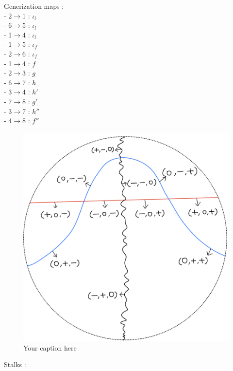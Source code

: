 Generization maps : \\

- 2$\rightarrow$1 : $\iota_l$\\
- 6$\rightarrow$5 : $\iota_l$\\
- 1$\rightarrow$4 : $\iota_l$\\
- 1$\rightarrow$5 : $\iota_f$\\
- 2$\rightarrow$6 : $\iota_f$\\
- 1$\rightarrow$4 : $f$\\
- 2$\rightarrow$3 : $g$\\
- 6$\rightarrow$7 : $h$\\
- 3$\rightarrow$4 : $h'$\\
- 7$\rightarrow$8 : $g'$\\
- 3$\rightarrow$7 : $h''$\\
- 4$\rightarrow$8 : $f''$\\

\begin{figure}[H] %
    \centering
    \includegraphics[width=\linewidth]{diagrams/lemma3/2.png} %
    \caption{Your caption here}
    \label{fig:your-label}
\end{figure}

Stalks :\\


